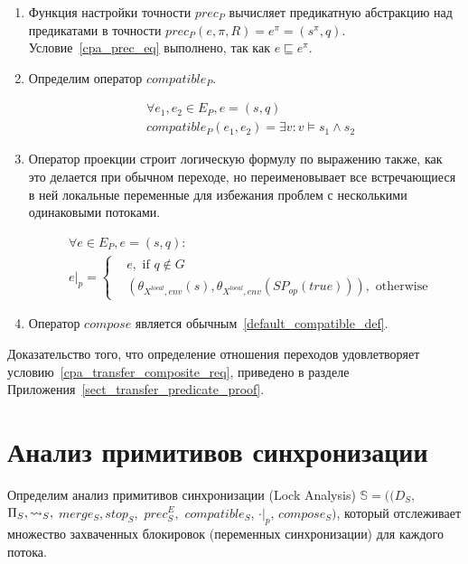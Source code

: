 \begin{enumerate}
\item Функция настройки точности $prec_P$ вычисляет предикатную абстракцию над предикатами в точности $prec_{P}(e, \pi, R) = e^{\pi} = (s^{\pi}, q)$.
Условие~\ref{cpa_prec_eq} выполнено, так как $e \sqsubseteq e^{\pi}$.

\item 
Определим оператор $compatible_P$.

\begin{equation}
\label{cpa_predicate_compatible}
\begin{aligned}
& \forall e_1, e_2 \in E_P, e = (s, q) \\
& compatible_{P}(e_1, e_2) = \exists v: v \models s_1 \land s_2
\end{aligned}
\end{equation}

\item Оператор проекции строит логическую формулу по выражению также, как это делается при обычном переходе, но переименовывает все встречающиеся в ней локальные переменные для избежания проблем с несколькими одинаковыми потоками.

\begin{equation}
\begin{aligned}
& \forall e \in E_P, e =(s,q): \\
& e|_p = 
\begin{cases}
&e, \mbox{ if } q \notin G\\
&(\theta_{X^{local},env}(s),\theta_{X^{local},env}(SP_{op}(true))), \mbox{ otherwise}
\end{cases}
\end{aligned}
\end{equation}

\item Оператор $compose$ является обычным~\ref{default_compatible_def}.

\end{enumerate}

Доказательство того, что определение отношения переходов удовлетворяет условию~\ref{cpa_transfer_composite_req}, приведено в разделе Приложения~\ref{sect_transfer_predicate_proof}. 


\section{Анализ примитивов синхронизации}
\label{sect_lock_analysis}

Определим анализ примитивов синхронизации (Lock Analysis) $\mathbb{S}=((D_{S},$ $\Pi_{S}, \leadsto_{S},$ $merge_{S}, stop_{S},$ $prec^E_{S},$ $compatible_{S}$, $\cdot|_p$, $compose_S)$, который отслеживает множество захваченных блокировок (переменных синхронизации) для каждого потока. 

